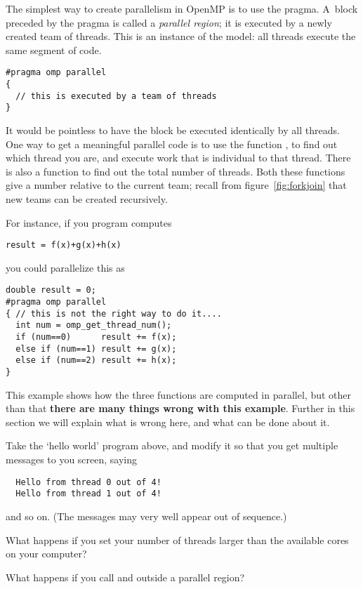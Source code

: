The simplest way to create parallelism in OpenMP is to use
the  pragma. A~block preceded by the  pragma
is called a \emph{parallel region}; it
is executed by a newly created team of threads. 
This is an instance of the  model: all threads execute the same
segment of code.
\begin{verbatim}
#pragma omp parallel
{
  // this is executed by a team of threads
}
\end{verbatim}
It would be pointless to have the block be executed identically by
all threads. One way to get a meaningful parallel code is to use the function
, to find out which thread you are,
and execute work that is individual to that thread.
There is also a function
 to find out the total number of threads.
Both these functions give a number relative to the current team;
recall from figure~\ref{fig:forkjoin} that new teams can be created recursively.

For instance, if you program computes
\begin{verbatim}
result = f(x)+g(x)+h(x)
\end{verbatim}
you could parallelize this as
\begin{verbatim}
double result = 0;
#pragma omp parallel
{ // this is not the right way to do it....
  int num = omp_get_thread_num();
  if (num==0)      result += f(x);
  else if (num==1) result += g(x);
  else if (num==2) result += h(x);
}
\end{verbatim}
This example shows how the three functions are computed in parallel,
but other than that \textbf{there are many things wrong with this example}.
Further in this section we will explain what is wrong here,
and what can be done about it.

\begin{exercise}
  Take the `hello world' program above, and modify it so that you get
  multiple messages to you screen, saying
\begin{verbatim}
  Hello from thread 0 out of 4!
  Hello from thread 1 out of 4!
\end{verbatim}
  and so on. (The messages may very well appear out of sequence.)


  What happens if you set your number of threads larger than the available
  cores on your computer?
\end{exercise}

\begin{exercise}
  What happens if you call  and 
  outside a parallel region?
\end{exercise}

